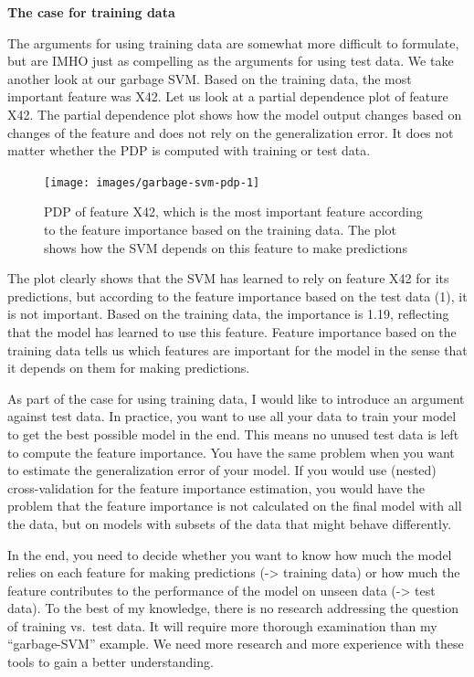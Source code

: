 \documentclass[
  12pt,
]{krantz}
\begin{document}
\textbf{The case for training data}

The arguments for using training data are somewhat more difficult to formulate, but are IMHO just as compelling as the arguments for using test data.
We take another look at our garbage SVM.
Based on the training data, the most important feature was X42.
Let us look at a partial dependence plot of feature X42.
The partial dependence plot shows how the model output changes based on changes of the feature and does not rely on the generalization error.
It does not matter whether the PDP is computed with training or test data.

\begin{figure}

{\centering \texttt{[image: images/garbage-svm-pdp-1]} 

}

\caption{PDP of feature X42, which is the most important feature according to the feature importance based on the training data. The plot shows how the SVM depends on this feature to make predictions}\label{fig:garbage-svm-pdp}
\end{figure}

The plot clearly shows that the SVM has learned to rely on feature X42 for its predictions, but according to the feature importance based on the test data (1), it is not important.
Based on the training data, the importance is 1.19, reflecting that the model has learned to use this feature.
Feature importance based on the training data tells us which features are important for the model in the sense that it depends on them for making predictions.

As part of the case for using training data, I would like to introduce an argument against test data.
In practice, you want to use all your data to train your model to get the best possible model in the end.
This means no unused test data is left to compute the feature importance.
You have the same problem when you want to estimate the generalization error of your model.
If you would use (nested) cross-validation for the feature importance estimation, you would have the problem that the feature importance is not calculated on the final model with all the data, but on models with subsets of the data that might behave differently.

In the end, you need to decide whether you want to know how much the model relies on each feature for making predictions (-\textgreater{} training data) or how much the feature contributes to the performance of the model on unseen data (-\textgreater{} test data).
To the best of my knowledge, there is no research addressing the question of training vs.~test data.
It will require more thorough examination than my ``garbage-SVM'' example.
We need more research and more experience with these tools to gain a better understanding.
\end{document}

